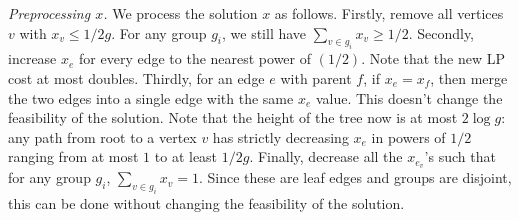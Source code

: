 \documentclass[11pt]{article}
\begin{document}
\noindent
{\em Preprocessing $x$.} 
We process the solution $x$ as follows.
Firstly, remove all vertices $v$ with $x_v \le 1/2g$. For any group $g_i$, we still have $\sum_{v\in g_i} x_v \ge 1/2$. Secondly, increase $x_e$ for every edge to the nearest power of $(1/2)$. Note that the new LP cost 
at most doubles. Thirdly, for an edge $e$ with parent $f$, if $x_e = x_f$, then merge the two edges into a single edge with the same $x_e$ value. This doesn't change the feasibility of the solution.  
Note that the height of the tree now is at most $2\log g$: any path from root to a vertex $v$ has strictly decreasing $x_e$ in powers of $1/2$ ranging from at most $1$ to at least $1/2g$. 
Finally, decrease all the $x_{e_v}$'s such that for any group $g_i$, $\sum_{v\in g_i} x_v = 1$.
Since these are leaf edges and groups are disjoint, this can be done without changing the feasibility of the solution.
\end{document}
